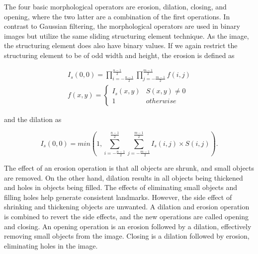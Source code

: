 
The four basic morphological operators are erosion, dilation, closing, and opening, where the two latter are a combination of the first operations. In contrast to Gaussian filtering, the morphological operators are used in binary images but utilize the same sliding structuring element technique. As the image, the structuring element does also have binary values. If we again restrict the structuring element to be of odd width and height, the erosion is defined as 

\begin{equation}
    \begin{split}
        I_s(0,0) = \prod_{i = -\frac{n-1}{2}}^\frac{n-1}{2} \prod_{j = -\frac{m-1}{2}}^\frac{m-1}{2} f(i,j) \\
        f(x,y) = 
        \begin{cases}
        I_s(x,y) & S(x,y) \neq 0 \\
        1 & otherwise
        \end{cases}
    \end{split}
    \label{eq:erosion}
\end{equation}

and the dilation as

\begin{equation}
    I_s(0,0) = min(1, \sum_{i = -\frac{n-1}{2}}^\frac{n-1}{2} \sum_{j = -\frac{m-1}{2}}^\frac{m-1}{2} I_s(i,j) \times S(i,j)).
    \label{eq:dialation}
\end{equation}

The effect of an erosion operation is that all objects are shrunk, and small objects are removed. On the other hand, dilation results in all objects being thickened and holes in objects being filled. The effects of eliminating small objects and filling holes help generate consistent landmarks. However, the side effect of shrinking and thickening objects are unwanted. A dilation and erosion operation is combined to revert the side effects, and the new operations are called opening and closing. An opening operation is an erosion followed by a dilation, effectively removing small objects from the image. Closing is a dilation followed by erosion, eliminating holes in the image. 
